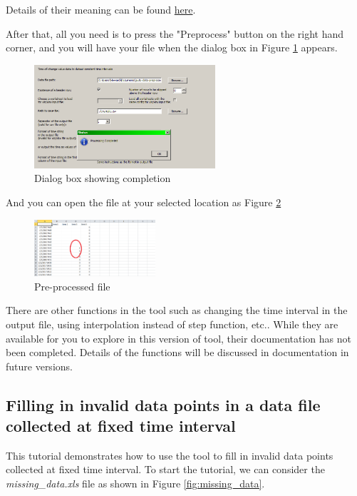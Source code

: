 \documentclass[12pt,a4paper]{article}
\begin{document}
Details of their meaning can be found \href{https://docs.python.org/3.5/library/datetime.html\#strftime-and-strptime-behavior}{here}.

After that, all you need is to press the "Preprocess" button on the right hand corner, and you will have your file when the dialog box in Figure \ref{fig:complete} appears.

\begin{figure}[H]
\centering
\includegraphics[width=0.6\textwidth]{complete.png}
\caption{Dialog box showing completion}
\label{fig:complete}
\end{figure}

And you can open the file at your selected location as Figure \ref{fig:step}

\begin{figure}[H]
\centering
\includegraphics[width=0.4\textwidth]{step.png}
\caption{Pre-processed file}
\label{fig:step}
\end{figure}

There are other functions in the tool such as changing the time interval in the output file, using interpolation instead of step function, etc..
While they are available for you to explore in this version of tool, their documentation has not been completed.
Details of the functions will be discussed in documentation in future versions.

\subsection{Filling in invalid data points in a data file collected at fixed time interval}
\label{sec:tutorial_invalid}

This tutorial demonstrates how to use the tool to fill in invalid data points collected at fixed time interval.
To start the tutorial, we can consider the \emph{missing\_data.xls} file as shown in Figure \ref{fig:missing_data}.
\end{document}
